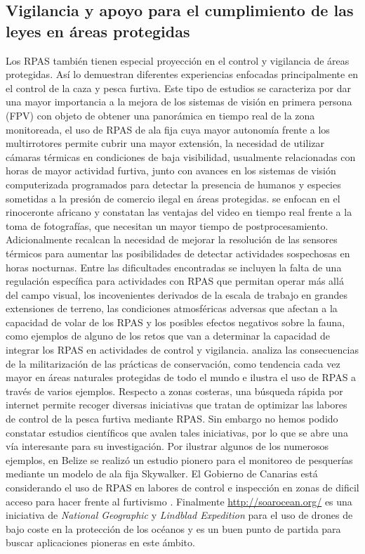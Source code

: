 \documentclass[twocolumn]{extarticle}
\begin{document}
\subsection{Vigilancia y apoyo para el cumplimiento de las leyes en
áreas
protegidas}\label{vigilancia-y-apoyo-para-el-cumplimiento-de-las-leyes-en-areas-protegidas}

Los RPAS también tienen especial proyección en el control y vigilancia
de áreas protegidas. Así lo demuestran diferentes experiencias enfocadas
principalmente en el control de la caza y pesca furtiva. Este tipo de
estudios se caracteriza por dar una mayor importancia a la mejora de los
sistemas de visión en primera persona (FPV) con objeto de obtener una
panorámica en tiempo real de la zona monitoreada, el uso de RPAS de ala
fija cuya mayor autonomía frente a los multirrotores permite cubrir una
mayor extensión, la necesidad de utilizar cámaras térmicas en
condiciones de baja visibilidad, usualmente relacionadas con horas de
mayor actividad furtiva, junto con avances en los sistemas de visión
computerizada programados para detectar la presencia de humanos y
especies sometidas a la presión de comercio ilegal en áreas protegidas.
\citep{Mulero-Pazmany2014} se enfocan en el rinoceronte africano y
constatan las ventajas del video en tiempo real frente a la toma de
fotografías, que necesitan un mayor tiempo de postprocesamiento.
Adicionalmente recalcan la necesidad de mejorar la resolución de las
sensores térmicos para aumentar las posibilidades de detectar
actividades sospechosas en horas nocturnas. Entre las dificultades
encontradas se incluyen la falta de una regulación específica para
actividades con RPAS que permitan operar más allá del campo visual, los
incovenientes derivados de la escala de trabajo en grandes extensiones
de terreno, las condiciones atmosféricas adversas que afectan a la
capacidad de volar de los RPAS y los posibles efectos negativos sobre la
fauna, como ejemplos de alguno de los retos que van a determinar la
capacidad de integrar los RPAS en actividades de control y vigilancia.
\citep{Duffy2014} analiza las consecuencias de la militarización de las
prácticas de conservación, como tendencia cada vez mayor en áreas
naturales protegidas de todo el mundo e ilustra el uso de RPAS a través
de varios ejemplos. Respecto a zonas costeras, una búsqueda rápida por
internet permite recoger diversas iniciativas que tratan de optimizar
las labores de control de la pesca furtiva mediante RPAS. Sin embargo no
hemos podido constatar estudios científicos que avalen tales
iniciativas, por lo que se abre una vía interesante para su
investigación. Por ilustrar algunos de los numerosos ejemplos, en Belize
se realizó un estudio pionero para el monitoreo de pesquerías mediante
un modelo de ala fija Skywalker. El Gobierno de Canarias está
considerando el uso de RPAS en labores de control e inspección en zonas
de dificil acceso para hacer frente al furtivismo \citep{Canarias2017} .
Finalmente \url{http://soarocean.org/} es una iniciativa de
\emph{National Geographic} y \emph{Lindblad Expedition} para el uso de
drones de bajo coste en la protección de los océanos y es un buen punto
de partida para buscar aplicaciones pioneras en este ámbito.
\end{document}
